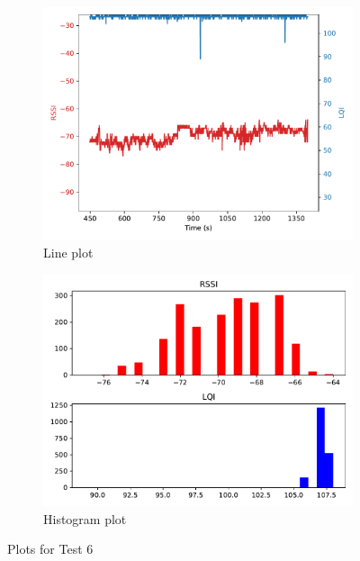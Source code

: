 \documentclass[runningheads]{llncs}
\begin{document}
\begin{figure}[ht]
    \centering
    \begin{subfigure}[b]{0.45\textwidth}
        \centering
        \includegraphics[width=\textwidth]{images/1-50-0-15-line.pdf}
        \caption{Line plot}
    \end{subfigure}
    \hfill
    \begin{subfigure}[b]{0.45\textwidth}
        \centering
        \includegraphics[width=\textwidth]{images/1-50-0-15-histogram.pdf}
        \caption{Histogram plot}
    \end{subfigure}
    \caption{Plots for Test 6}
\end{figure}
\end{document}
